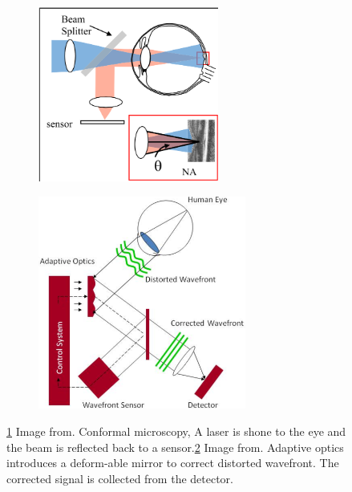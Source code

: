 \documentclass[]{article}
\begin{document}
\begin{figure}[ht]
	\centering
	\begin{subfigure}[t]{0.49\textwidth}
		\centering
		\includegraphics[width=0.65\textwidth]{confocal_imaging_eye.png}
		\caption{}
		\label{fig:confocal-microscopy}
	\end{subfigure}
	\hfil
	\begin{subfigure}[t]{0.49\textwidth}
		\centering
		\includegraphics[width=0.75\textwidth]{Adaptive_Imaging.png}
		\caption{}
		\label{fig:adaptic-optics}
	\end{subfigure}
	\caption{\ref{fig:confocal-microscopy} Image from\cite{burns_adaptive_2019}. 
	Conformal microscopy, A laser is shone to the eye and the beam is reflected back to a sensor.\ref{fig:adaptic-optics} Image from\cite{adaptive_image}. Adaptive optics introduces a deform-able mirror to correct distorted wavefront.
	The corrected signal is collected from the detector.
	}
	\label{fig:labep}
\end{figure}
\end{document}
